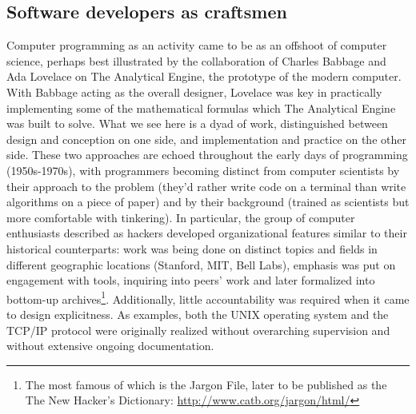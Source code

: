 \documentclass{article}
\begin{document}
\subsection{Software developers as craftsmen}

Computer programming as an activity came to be as an offshoot of computer science, perhaps best illustrated by the collaboration of Charles Babbage and Ada Lovelace on The Analytical Engine, the prototype of the modern computer. With Babbage acting as the overall designer, Lovelace was key in practically implementing some of the mathematical formulas which The Analytical Engine was built to solve. What we see here is a dyad of work, distinguished between design and conception on one side, and implementation and practice on the other side. These two approaches are echoed throughout the early days of programming (1950s-1970s), with programmers becoming distinct from computer scientists by their approach to the problem (they'd rather write code on a terminal than write algorithms on a piece of paper) and by their background (trained as scientists but more comfortable with tinkering)\cite{ensmenger_computer_2012}. In particular, the group of computer enthusiasts described as hackers developed organizational features similar to their historical counterparts: work was being done on distinct topics and fields in different geographic locations (Stanford, MIT, Bell Labs)\cite{raymond_cathedral_2001}, emphasis was put on engagement with tools, inquiring into peers' work\cite{levy_hackers_2010} and later formalized into bottom-up archives\footnote{The most famous of which is the Jargon File, later to be published as the The New Hacker's Dictionary: \url{http://www.catb.org/jargon/html/}}. Additionally, little accountability was required when it came to design explicitness. As examples, both the UNIX operating system and the TCP/IP protocol were originally realized without overarching supervision and without extensive ongoing documentation\cite{seibel_coders_2009,raymond_cathedral_2001}.
\end{document}
